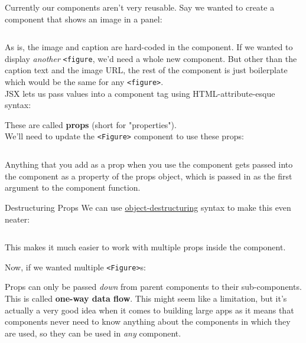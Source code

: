 Currently our components aren't very reusable. Say we wanted to create a component that shows an image in a panel:

\inputminted{jsx}{01/figures/03/01-Figure.jsx}

As is, the image and caption are hard-coded in the component. If we wanted to display \textit{another} \texttt{<figure}, we'd need a whole new component. But other than the caption text and the image URL, the rest of the component is just boilerplate which would be the same for any \texttt{<figure>}.
\\

JSX lets us pass values into a component tag using HTML-attribute-esque syntax:


These are called \textbf{props} (short for "properties").
\\

We'll need to update the \texttt{<Figure>} component to use these props:

\inputminted{jsx}{01/figures/03/03-Figure-props.jsx}

Anything that you add as a prop when you use the component gets passed into the component as a property of the props object, which is passed in as the first argument to the component function.

\begin{infobox}{Destructuring Props}
    We can use \href{https://developer.mozilla.org/en-US/docs/Web/JavaScript/Reference/Operators/Destructuring_assignment}{object-destructuring} syntax to make this even neater:

    \inputminted{jsx}{01/figures/03/04-Figure-destructure.jsx}

    This makes it much easier to work with multiple props inside the component.
\end{infobox}

Now, if we wanted multiple \texttt{<Figure>}s:


Props can only be passed \textit{down} from parent components to their sub-components. This is called \textbf{one-way data flow}. This might seem like a limitation, but it's actually a very good idea when it comes to building large apps as it means that components never need to know anything about the components in which they are used, so they can be used in \textit{any} component.
\\

